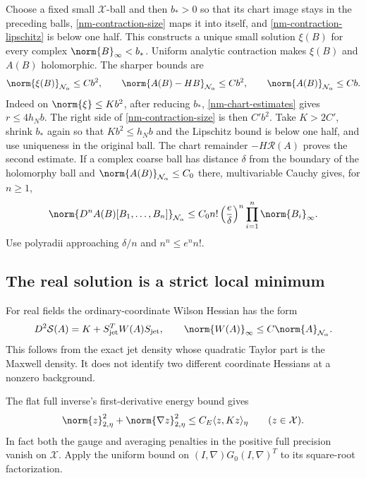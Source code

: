 Choose a fixed small $\mathcal X$-ball and then $b_*>0$ so that its
chart image stays in the preceding balls, \eqref{nm-contraction-size}
maps it into itself, and \eqref{nm-contraction-lipschitz} is below
one half. This constructs a unique small solution $\xi(B)$ for
every complex $\norm{B}_\infty<b_*$. Uniform analytic contraction
makes $\xi(B)$ and $A(B)$ holomorphic. The sharper bounds are
\begin{equation}\label{nm-quadratic-remainder}
 \norm{\xi(B)}_{\mathcal N_\alpha}\le Cb^2,
 \qquad \norm{A(B)-HB}_{\mathcal N_\alpha}\le Cb^2,
 \qquad \norm{A(B)}_{\mathcal N_\alpha}\le Cb.
\end{equation}
Indeed on $\norm{\xi}\le Kb^2$, after reducing $b_*$,
\eqref{nm-chart-estimates} gives $r\le4h_Nb$. The right side of
\eqref{nm-contraction-size} is then $C'b^2$. Take $K>2C'$, shrink
$b_*$ again so that $Kb^2\le h_Nb$ and the Lipschitz bound is below
one half, and use uniqueness in the original ball. The chart
remainder $-H\mathcal R(A)$ proves the second estimate.
If a complex coarse ball has distance $\delta$ from the boundary
of the holomorphy ball and $\norm{A(B)}_{\mathcal N_\alpha}\le C_0$
there, multivariable Cauchy gives, for $n\ge1$,
\begin{equation}\label{nm-cauchy}
 \norm{D^nA(B)[B_1,\ldots,B_n]}_{\mathcal N_\alpha}
 \le C_0 n!\left(\frac e\delta\right)^n
                    \prod_{i=1}^n\norm{B_i}_\infty.
\end{equation}
Use polyradii approaching $\delta/n$ and $n^n\le e^n n!$.

\subsection{The real solution is a strict local minimum}
\label{nm-minimum}

For real fields the ordinary-coordinate Wilson Hessian has the
form
\begin{equation}\label{nm-action-hessian}
 D^2\mathcal S(A)=K+S_{\rm jet}^TW(A)S_{\rm jet},
 \qquad \norm{W(A)}_\infty\le C\norm{A}_{\mathcal N_\alpha}.
\end{equation}
This follows from the exact jet density whose quadratic Taylor
part is the Maxwell density. It does not identify two different
coordinate Hessians at a nonzero background.

The flat full inverse's first-derivative energy bound gives
\begin{equation}\label{nm-coercivity}
 \norm{z}_{2,\eta}^2+\norm{\nabla z}_{2,\eta}^2
 \le C_E\langle z,Kz\rangle_\eta\qquad(z\in\mathcal X).
\end{equation}
In fact both the gauge and averaging penalties in the positive
full precision vanish on $\mathcal X$. Apply the uniform bound on
$(I,\nabla)G_0(I,\nabla)^T$ to its square-root factorization.

